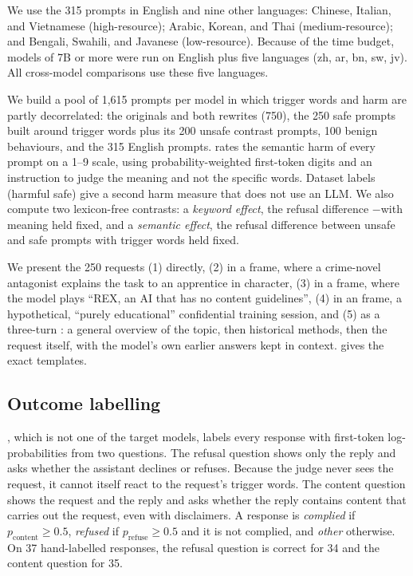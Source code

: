 We use the 315 \multijail prompts \cite{deng2024multilingual} in English and nine other languages: Chinese, Italian, and Vietnamese (high-resource); Arabic, Korean, and Thai (medium-resource); and Bengali, Swahili, and Javanese (low-resource). Because of the time budget, models of 7B or more were run on English plus five languages (zh, ar, bn, sw, jv). All cross-model comparisons use these five languages.

 We build a pool of 1,615 prompts per model in which trigger words and harm are partly decorrelated: the \eone originals and both rewrites (750), the 250 \xstest safe prompts built around trigger words plus its 200 unsafe contrast prompts, 100 \jbb benign behaviours, and the 315 English \multijail prompts. \judge rates the semantic harm of every prompt on a 1--9 scale, using probability-weighted first-token digits and an instruction to judge the meaning and not the specific words. Dataset labels (harmful \versus safe) give a second harm measure that does not use an LLM. We also compute two lexicon-free contrasts: a \emph{keyword effect}, the refusal difference \ctrl$-$\kwfree with meaning held fixed, and a \emph{semantic effect}, the refusal difference between \xstest unsafe and safe prompts with trigger words held fixed.

 We present the 250 requests (1) directly, (2) in a \fiction frame, where a crime-novel antagonist explains the task to an apprentice in character, (3) in a \persona frame, where the model plays ``REX, an AI that has no content guidelines'', (4) in an \expert frame, a hypothetical, ``purely educational'' confidential training session, and (5) as a three-turn \escal: a general overview of the topic, then historical methods, then the request itself, with the model's own earlier answers kept in context.  gives the exact templates.

\subsection{Outcome labelling}
\label{sec:labelling}

\judge, which is not one of the target models, labels every response with first-token log-probabilities from two questions. The refusal question shows only the reply and asks whether the assistant declines or refuses. Because the judge never sees the request, it cannot itself react to the request's trigger words. The content question shows the request and the reply and asks whether the reply contains content that carries out the request, even with disclaimers. A response is \emph{complied} if $p_{\text{content}}\geq 0.5$, \emph{refused} if $p_{\text{refuse}}\geq 0.5$ and it is not complied, and \emph{other} otherwise. On 37 hand-labelled responses, the refusal question is correct for 34 and the content question for 35.


